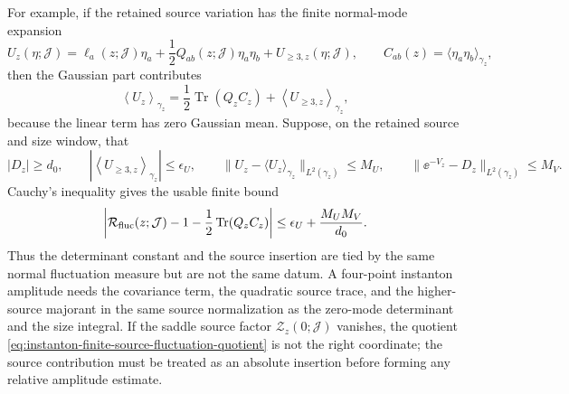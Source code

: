 \begin{controlledapproximation}
For example, if the retained source variation has the finite normal-mode
expansion
\begin{equation}
  U_z(\eta;\mathcal J)
  =
  \ell_a(z;\mathcal J)\eta_a
  +\frac12 Q_{ab}(z;\mathcal J)\eta_a\eta_b
  +U_{\ge3,z}(\eta;\mathcal J),
  \qquad
  C_{ab}(z)=\langle\eta_a\eta_b\rangle_{\gamma_z},
  \label{eq:instanton-finite-gaussian-source-quadratic}
\end{equation}
then the Gaussian part contributes
\[
  \left\langle U_z\right\rangle_{\gamma_z}
  =
  \frac12\operatorname{Tr}(Q_z C_z)
  +
  \left\langle U_{\ge3,z}\right\rangle_{\gamma_z},
\]
because the linear term has zero Gaussian mean.  Suppose, on the retained
source and size window, that
\[
  |D_z|\ge d_0,\qquad
  \left|\left\langle U_{\ge3,z}\right\rangle_{\gamma_z}\right|\le\epsilon_U,
  \qquad
  \|U_z-\langle U_z\rangle_{\gamma_z}\|_{L^2(\gamma_z)}\le M_U,
  \qquad
  \|\ee^{-V_z}-D_z\|_{L^2(\gamma_z)}\le M_V .
\]
Cauchy's inequality gives the usable finite bound
\begin{equation}
  \left|
    \mathcal R_{\rm fluc}(z;\mathcal J)
    -
    1
    -
    \frac12\operatorname{Tr}(Q_zC_z)
  \right|
  \le
  \epsilon_U+\frac{M_UM_V}{d_0}.
  \label{eq:instanton-finite-gaussian-source-bound}
\end{equation}
Thus the determinant constant and the source insertion are tied by the same
normal fluctuation measure but are not the same datum.  A four-point
instanton amplitude needs the covariance term, the quadratic source trace, and
the higher-source majorant in the same source normalization as the zero-mode
determinant and the size integral.  If the saddle source factor
\(\mathcal Z_z(0;\mathcal J)\) vanishes, the quotient
\eqref{eq:instanton-finite-source-fluctuation-quotient} is not the right
coordinate; the source contribution must be treated as an absolute insertion
before forming any relative amplitude estimate.
\end{controlledapproximation}

